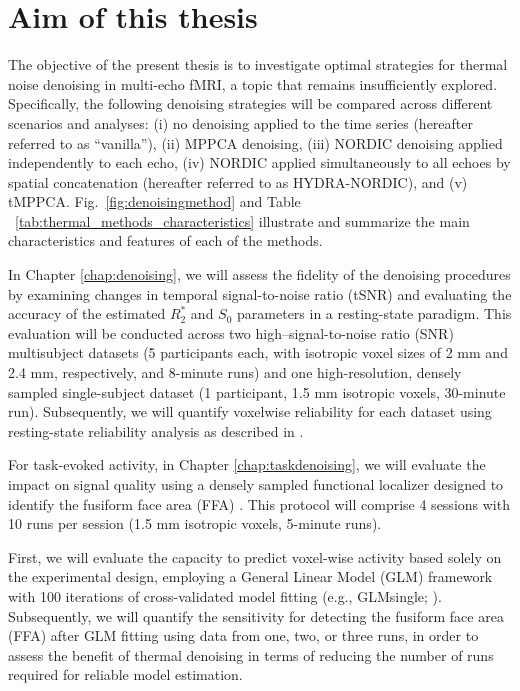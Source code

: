 \section{Aim of this thesis}
The objective of the present thesis is to investigate optimal strategies for thermal noise denoising in multi-echo fMRI, a topic that remains insufficiently explored. 
Specifically, the following denoising strategies will be compared across different scenarios and analyses: (i) no denoising applied to the time series (hereafter referred to as “vanilla”), (ii) MPPCA denoising, (iii) NORDIC denoising applied independently to each echo, (iv) NORDIC applied simultaneously to all echoes by spatial concatenation (hereafter referred to as HYDRA-NORDIC), and (v) tMPPCA. Fig.~\ref{fig:denoisingmethod} and Table ~\ref{tab:thermal_methods_characteristics} illustrate and summarize the main characteristics and features of each of the methods.

In Chapter \ref{chap:denoising}, we will assess the fidelity of the denoising procedures by examining changes in temporal signal-to-noise ratio (tSNR) and evaluating the accuracy of the estimated $R_2^*$ and $S_0$ parameters in a resting-state paradigm. This evaluation will be conducted across two high–signal-to-noise ratio (SNR) multisubject datasets (5 participants each, with isotropic voxel sizes of 2 mm and 2.4 mm, respectively, and 8-minute runs) and one high-resolution, densely sampled single-subject dataset (1 participant, 1.5 mm isotropic voxels, 30-minute run). Subsequently, we will quantify voxelwise reliability for each dataset using resting-state reliability analysis as described in \citet{lynchRapidPrecisionFunctional2020}.

For task-evoked activity, in Chapter \ref{chap:taskdenoising}, we will evaluate the impact on signal quality using a densely sampled functional localizer designed to identify the fusiform face area (FFA) \citep{kanwisherFusiformFaceArea1997, bermanEvaluatingFunctionalLocalizers2010}. This protocol will comprise 4 sessions with 10 runs per session (1.5 mm isotropic voxels, 5-minute runs).

First, we will evaluate the capacity to predict voxel-wise activity based solely on the experimental design, employing a General Linear Model (GLM) framework with 100 iterations of cross-validated model fitting (e.g., GLMsingle; \citep{princeImprovingAccuracySingletrial2022}). Subsequently, we will quantify the sensitivity for detecting the fusiform face area (FFA) after GLM fitting using data from one, two, or three runs, in order to assess the benefit of thermal denoising in terms of reducing the number of runs required for reliable model estimation.

